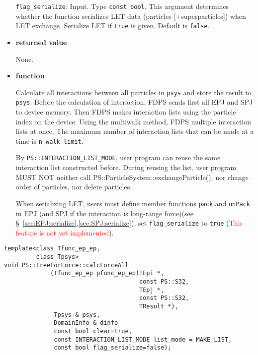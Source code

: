 \begin{itemize}
\texttt{flag\_serialize}: Input. Type \texttt{const bool}. This argument determines whether the function serializes LET data (particles [+superparticles]) when LET exchange. Serialize LET if \texttt{true} is given. Default is \texttt{false}.

\item {\bf returned value}

None.

\item {\bf function}

Calculate all interactions between all particles in \texttt{psys} and store the result to \texttt{psys}. Before the calculation of interaction, FDPS sends first all EPJ and SPJ to device memory. Then FDPS makes interaction lists using the particle index on the device. Using the multiwalk method, FDPS multiple interaction lists at once. The maximum number of interaction lists that can be made at a time is \texttt{n\_walk\_limit}.

By \texttt{PS::INTERACTION\_LIST\_MODE}, user program can reuse the same interaction list constructed before. During reusing the list, user program MUST NOT neither call \newline PS::ParticleSystem::exchangeParticle(), nor change order of particles, nor delete particles.

When serializing LET, users must define member functions \texttt{pack} and \texttt{unPack} in EPJ (and SPJ if the interaction is long-range force)(see \S~\ref{sec:EPJ:serialize},\ref{sec:SPJ:serialize}), set \texttt{flag\_serialize} to \texttt{true} (\textcolor{red}{This feature is not yet implemented}).

\end{itemize}



\begin{screen}
\begin{verbatim}
template<class Tfunc_ep_ep,
         class Tpsys>
void PS::TreeForForce::calcForceAll
             (Tfunc_ep_ep pfunc_ep_ep(TEpi *,
                                      const PS::S32,
                                      TEpj *,
                                      const PS::S32,
                                      TResult *),
              Tpsys & psys,
              DomainInfo & dinfo
              const bool clear=true,
              const INTERACTION_LIST_MODE list_mode = MAKE_LIST,
              const bool flag_serialize=false);
\end{verbatim}
\end{screen}

